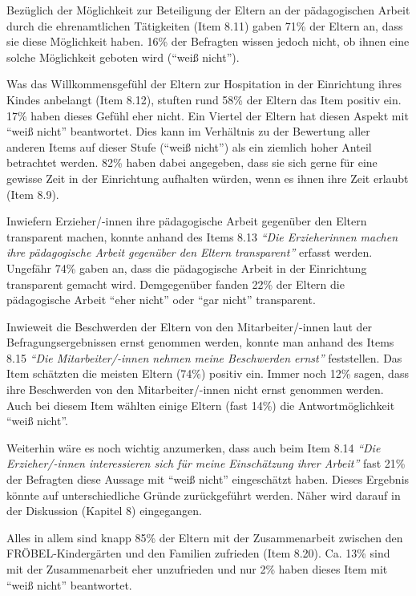 \documentclass[12pt,a4paper]{article}
\begin{document}
	Bezüglich der Möglichkeit zur Beteiligung der Eltern an der pädagogischen Arbeit durch die ehrenamtlichen Tätigkeiten (Item 8.11) gaben 71\% der Eltern an, dass sie diese Möglichkeit haben. 16\% der Befragten wissen jedoch nicht, ob ihnen eine solche Möglichkeit geboten wird ("`weiß nicht"'). 
		
	Was das Willkommensgefühl der Eltern zur Hospitation in der Einrichtung ihres Kindes anbelangt (Item 8.12), stuften rund 58\% der Eltern das Item positiv ein. 17\% haben dieses Gefühl eher nicht. Ein Viertel der Eltern hat diesen Aspekt mit "`weiß nicht"' beantwortet. Dies kann im Verhältnis zu der Bewertung aller anderen Items auf dieser Stufe ("`weiß nicht"') als ein ziemlich hoher Anteil betrachtet werden. 82\% haben dabei angegeben, dass sie sich gerne für eine gewisse Zeit in der Einrichtung aufhalten würden, wenn es ihnen ihre Zeit erlaubt (Item 8.9).
	
	Inwiefern Erzieher/-innen ihre pädagogische Arbeit gegenüber den Eltern transparent machen, konnte anhand des Items 8.13 \textit{"`Die Erzieherinnen machen ihre pädagogische Arbeit gegenüber den Eltern transparent"'} erfasst werden. Ungefähr 74\% gaben an, dass die pädagogische Arbeit in der Einrichtung transparent gemacht wird. Demgegenüber fanden 22\% der Eltern die pädagogische Arbeit "`eher nicht"' oder "`gar nicht"' transparent.
	
	Inwieweit die Beschwerden der Eltern von den Mitarbeiter/-innen laut der Befragungsergebnissen ernst genommen werden, konnte man anhand des Items 8.15 \textit{"`Die Mitarbeiter/-innen nehmen meine Beschwerden ernst"'} feststellen. Das Item schätzten die meisten Eltern (74\%) positiv ein. Immer noch 12\% sagen, dass ihre Beschwerden von den Mitarbeiter/-innen nicht ernst genommen werden. Auch bei diesem Item wählten einige Eltern (fast 14\%) die Antwortmöglichkeit "`weiß nicht"'.
	
	Weiterhin wäre es noch wichtig anzumerken, dass auch beim Item 8.14 \textit{"`Die Erzieher/-innen interessieren sich für meine Einschätzung ihrer Arbeit"'} fast 21\% der Befragten diese Aussage mit "`weiß nicht"' eingeschätzt haben. Dieses Ergebnis könnte auf unterschiedliche Gründe zurückgeführt werden. Näher wird darauf in der Diskussion (Kapitel 8) eingegangen.
	
 	Alles in allem sind knapp 85\% der Eltern mit der Zusammenarbeit zwischen den FRÖBEL-Kindergärten und den Familien zufrieden (Item 8.20). Ca. 13\% sind mit der Zusammenarbeit eher unzufrieden und nur 2\% haben dieses Item mit "`weiß nicht"' beantwortet.
 	
\end{document}
